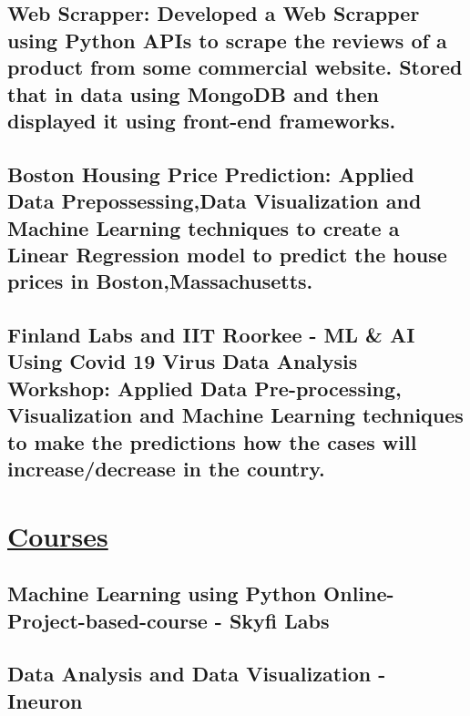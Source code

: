 \documentclass{article}
\begin{document}
\subsection{\textbf{Web Scrapper:}
    \textmd{Developed a Web Scrapper using Python APIs to scrape the reviews of a product from some commercial website.
        Stored that in data using MongoDB and then displayed it using front-end frameworks.}}

\subsection{\textbf{Boston Housing Price Prediction:}
    \textmd{Applied Data Prepossessing,Data Visualization and Machine Learning techniques to create a
        Linear Regression model to predict the house prices in Boston,Massachusetts. } }

\subsection{\textbf{Finland Labs and IIT Roorkee - ML \& AI Using Covid 19 Virus Data Analysis Workshop:}
    \textmd{Applied Data Pre-processing, Visualization and Machine Learning techniques to make the predictions how the cases will increase/decrease in the country. } }


\section{\underline{Courses}}


\subsection{\textbf{Machine Learning using Python Online-Project-based-course }
    \textmd{- Skyfi Labs}}

\subsection{\textbf{Data Analysis and Data Visualization}
    \textmd{- Ineuron}}
\end{document}
